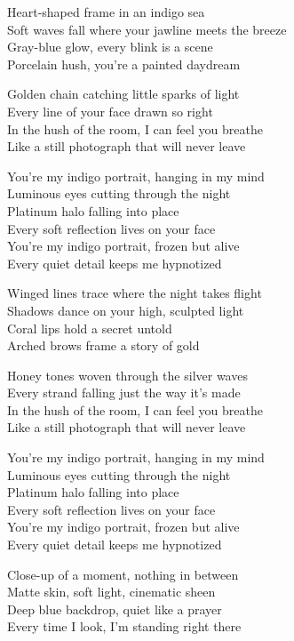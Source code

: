 \begin{lyrics}
Heart-shaped frame in an indigo sea\\
Soft waves fall where your jawline meets the breeze\\
Gray-blue glow, every blink is a scene\\
Porcelain hush, you’re a painted daydream

Golden chain catching little sparks of light\\
Every line of your face drawn so right\\
In the hush of the room, I can feel you breathe\\
Like a still photograph that will never leave

You’re my indigo portrait, hanging in my mind\\
Luminous eyes cutting through the night\\
Platinum halo falling into place\\
Every soft reflection lives on your face\\
You’re my indigo portrait, frozen but alive\\
Every quiet detail keeps me hypnotized

Winged lines trace where the night takes flight\\
Shadows dance on your high, sculpted light\\
Coral lips hold a secret untold\\
Arched brows frame a story of gold

Honey tones woven through the silver waves\\
Every strand falling just the way it’s made\\
In the hush of the room, I can feel you breathe\\
Like a still photograph that will never leave

You’re my indigo portrait, hanging in my mind\\
Luminous eyes cutting through the night\\
Platinum halo falling into place\\
Every soft reflection lives on your face\\
You’re my indigo portrait, frozen but alive\\
Every quiet detail keeps me hypnotized

Close-up of a moment, nothing in between\\
Matte skin, soft light, cinematic sheen\\
Deep blue backdrop, quiet like a prayer\\
Every time I look, I’m standing right there


\end{lyrics}

